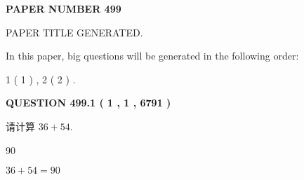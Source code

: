 \documentclass{ctexart}
\begin{document}
   
   
   
\newpage 
\setcounter{page}{ 
   499001 } 
   
   
   
   
 {\textbf{ \Large{ PAPER NUMBER  499  }}}
   
   
\vspace{0.2in}
   
   
   
   
   
   
   
   
 \vspace{0.2in}
 
 
 
 
   
   
 PAPER TITLE GENERATED.
   
   
   
\vspace{0.2in}
   
In this paper, big questions will be generated in the following order: 
   
   
   1 ( 1 )
 ,
   2 ( 2 )
 .
  
\vspace{0.2in}
  
{\textbf{\Large{QUESTION
499.1 
 ( 1 , 1 , 6791 )
}}}
  
  
 
请计算 $ %
36 +  %
54 $.
 
 
 
\noindent{}
 
 

90
 
 
\noindent{}
 
 

 
 
 
\noindent{}
 
 

$ %
36 +  %
54=   %
90$
 
 
\noindent{}
 
 

 
   
   
   
\end{document}
